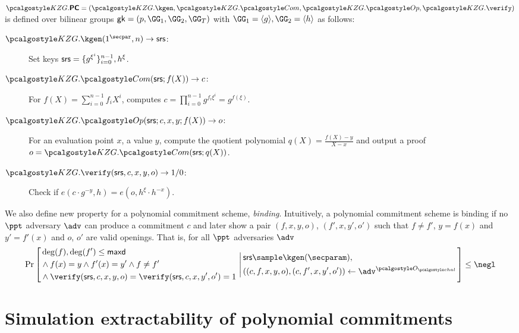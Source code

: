 \documentclass[runningheads,11pt]{llncs}
\begin{document}
$\Kzg.\PC = (\Kzg.\kgen, \Kzg.\com, \Kzg.\open, \Kzg.\verify)$ is defined over bilinear groups $\gk=(p,\GG_1,\allowbreak \GG_2, \allowbreak \GG_T )$ with $\GG_1 =\langle g\rangle, \GG_2 =\langle h \rangle$ as follows:
\begin{description}%
\item[$\Kzg.\kgen(1^\secpar, n) \to \srs$:] Set keys
$\mathsf{srs} = \{g^{\xi^i}\}_{i=0}^{n-1}, h^\xi$.
\item[$\Kzg.\CM(\srs; f(X)) \to c$:] For
  $f(X) = \sum_{i=0}^{n-1} f_i X^i$, computes
  $c=\prod _{i=0}^{n-1} g^{f_i \xi^i} = g^{f(\xi)} $.
\item[$\Kzg.\open(\srs; c, x, y; f(X)) \to o$:] For an evaluation point
  $x$, a value $y$, compute the quotient polynomial
  $q(X) = \displaystyle\frac{f(X) -y }{X-x}$ and output a proof
  $o = \Kzg.\CM(\srs; q(X)) $.
\item[$\Kzg.\verify(\srs, c, x, y, o) \to 1/0$:] Check if
  $e(c \cdot g^{-y}, h)=e(o , h^{\xi}\cdot h^{-x})$.
\end{description}

We also define new property for a polynomial commitment scheme,
\emph{binding}. Intuitively, a polynomial commitment scheme is binding if no
$\ppt$ adversary $\adv$ can produce a commitment $c$ and later show a pair
$(f, x, y, o)$, $(f', x, y', o')$ such that $f \neq f'$, $y = f(x)$ and $y' =
f'(x)$ and $o$, $o'$ are valid openings. That is, for all $\ppt$ adversaries
$\adv$
\[
  \Pr\left[
    \begin{aligned}
      & \deg(f), \deg(f') \leq \maxdeg \\
      &\land f(x) = y \land f'(x) = y' \land f
      \neq f' \\
      & \land \verify(\srs, c, x, y, o) = \verify(\srs, c, x, y', o') = 1
      \end{aligned}
      \,\left|\,
        \begin{aligned}
        &  \srs \sample \kgen(\secparam), \\
        &  ((c, f, x, y, o), (c, f', x, y', o')) \gets \adv^{\oraclec}
          \end{aligned}
        \right.\right] \leq \negl
\]

\section{Simulation extractability of polynomial commitments}
\end{document}
